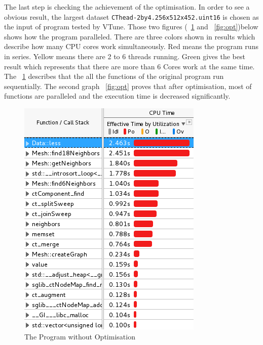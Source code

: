 \documentclass[conference]{IEEEtran}
\newcommand{\fref}[1]{\figurename~\ref{#1}}
\begin{document}
The last step is checking the achievement of the optimisation. In order to see a obvious result, the largest dataset \texttt{CThead-2by4.256x512x452.uint16} is chosen as the input of program tested by VTune. Those two figures (\fref{fig:noopt} and \fref{fig:opt})below shows how the program  paralleled. There are three colors shown in results which describe how many CPU cores work simultaneously. Red means the program runs in series. Yellow means there are 2 to 6 threads running. Green gives the best result which represents that there are more than 6 Cores work at the same time. The \fref{fig:noopt} describes that the all the functions of the original program run sequentially. The second graph \fref{fig:opt} proves that after optimisation, most of functions are paralleled and the execution time is decreased significantly. 
\begin{figure}[!h]
	\centering
	\includegraphics[width=\columnwidth]{noopt_vtune}
	\caption{The Program without Optimisation}
	\label{fig:noopt}
\end{figure}
\end{document}
